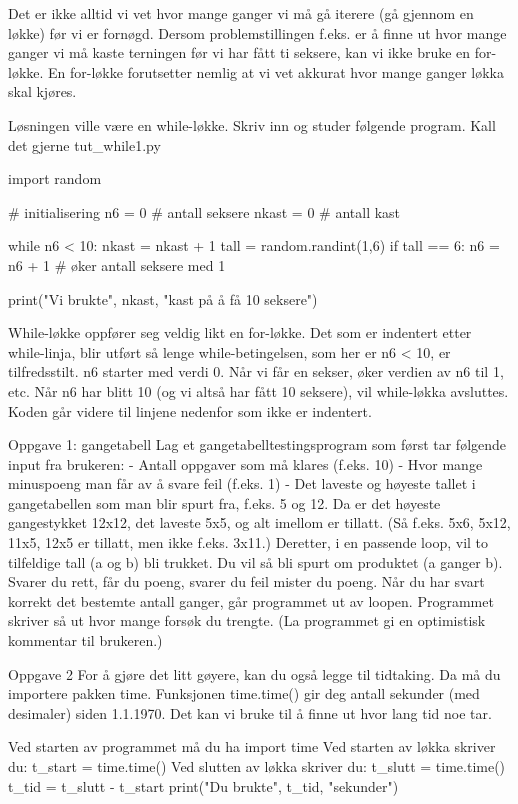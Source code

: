 \documentclass[a4paper,11pt,utf8]{book}
\begin{document}
Det er ikke alltid vi vet hvor mange ganger vi må gå iterere (gå gjennom en løkke)
før vi er fornøgd.
Dersom problemstillingen f.eks. er å finne ut hvor mange ganger vi må kaste terningen
før vi har fått ti seksere, kan vi ikke bruke en for-løkke.
En for-løkke forutsetter nemlig at vi vet akkurat hvor mange ganger løkka skal kjøres.

Løsningen ville være en while-løkke.
Skriv inn og studer følgende program. Kall det gjerne tut_while1.py

import random

# initialisering
n6    = 0  # antall seksere
nkast = 0  # antall kast

while n6 < 10: 
    nkast = nkast + 1
    tall = random.randint(1,6)
    if tall == 6:
       n6 = n6 + 1    # øker antall seksere med 1
    
print("Vi brukte", nkast, "kast på å få 10 seksere")

While-løkke oppfører seg veldig likt en for-løkke. 
Det som er indentert etter while-linja, blir utført så lenge while-betingelsen,
som her er n6 < 10, er tilfredsstilt.
n6 starter med verdi 0.
Når vi får en sekser, øker verdien av n6 til 1, etc.
Når n6 har blitt 10 (og vi altså har fått 10 seksere), vil while-løkka avsluttes.
Koden går videre til linjene nedenfor som ikke er indentert. 




Oppgave 1: gangetabell
Lag et gangetabelltestingsprogram som først tar følgende input fra brukeren:
- Antall oppgaver som må klares (f.eks. 10)
- Hvor mange minuspoeng man får av å svare feil (f.eks. 1)
- Det laveste og høyeste tallet i gangetabellen som man blir spurt fra, f.eks. 5 og 12.
Da er det høyeste gangestykket 12x12, det laveste 5x5, og alt imellom er tillatt.
(Så f.eks. 5x6, 5x12, 11x5, 12x5 er tillatt, men ikke f.eks. 3x11.) 
Deretter, i en passende loop, vil to tilfeldige tall (a og b) bli trukket.
Du vil så bli spurt om produktet (a ganger b).
Svarer du rett, får du poeng, svarer du feil mister du poeng.
Når du har svart korrekt det bestemte antall ganger, går programmet ut av loopen. 
Programmet skriver så ut hvor mange forsøk du trengte.
(La programmet gi en optimistisk kommentar til brukeren.) 


Oppgave 2
For å gjøre det litt gøyere, kan du også legge til tidtaking. 
Da må du importere pakken time.
Funksjonen time.time() gir deg antall sekunder (med desimaler) siden 1.1.1970.
Det kan vi bruke til å finne ut hvor lang tid noe tar.

Ved starten av programmet må du ha
import time
Ved starten av løkka skriver du: 
t_start = time.time()
Ved slutten av løkka skriver du: 
t_slutt = time.time()
t_tid = t_slutt - t_start
print("Du brukte", t_tid, "sekunder")
\end{document}
